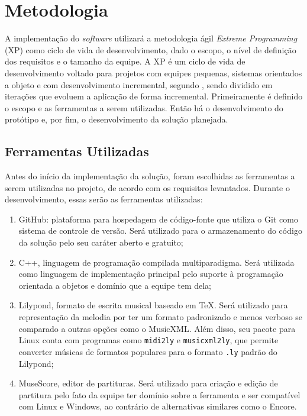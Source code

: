 \chapter[Metodologia]{Metodologia} \label{c2}

  A implementação do \textit{software} utilizará a metodologia ágil \textit{Extreme Programming} (XP) como ciclo de vida de desenvolvimento, dado o escopo, o nível de definição dos requisitos e o tamanho da equipe. A XP é um ciclo de vida de desenvolvimento voltado para projetos com equipes pequenas, sistemas orientados a objeto e com desenvolvimento incremental, segundo , sendo dividido em iterações que evoluem a aplicação de forma incremental. Primeiramente é definido o escopo e as ferramentas a serem utilizadas. Então há o desenvolvimento do protótipo e, por fim, o desenvolvimento da solução planejada.

  \section[Ferramentas Utilizadas]{Ferramentas Utilizadas}

    Antes do início da implementação da solução, foram escolhidas as ferramentas a serem utilizadas no projeto, de acordo com os requisitos levantados. Durante o desenvolvimento, essas serão as ferramentas utilizadas:

  \begin{enumerate}
    \item GitHub\footnotemark {}: plataforma para hospedagem de código-fonte que utiliza o Git como sistema de controle de versão. Será utilizado para o armazenamento do código da solução pelo seu caráter aberto e gratuito;
    \item C++\footnotemark {}, linguagem de programação compilada multiparadigma. Será utilizada como linguagem de implementação principal pelo suporte à programação orientada a objetos e domínio que a equipe tem dela;
    \item Lilypond\footnotemark {}, formato de escrita musical baseado em TeX. Será utilizado para representação da melodia por ter um formato padronizado e menos verboso se comparado a outras opções como o MusicXML. Além disso, seu pacote para Linux conta com programas como \lstinline{midi2ly} e \lstinline{musicxml2ly}, que permite converter músicas de formatos populares para o formato \lstinline{.ly} padrão do Lilypond;
    \item MuseScore\footnotemark {}, editor de partituras. Será utilizado para criação e edição de partitura pelo fato da equipe ter domínio sobre a ferramenta e ser compatível com Linux e Windows, ao contrário de alternativas similares como o Encore.
  \end{enumerate}

